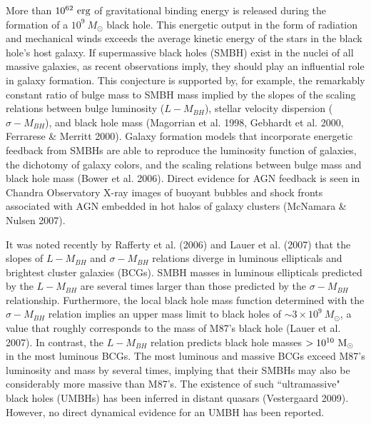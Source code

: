 \documentclass[12pt]{article}
\begin{document}
%
%
\def\gae{\mathrel{\hbox{\rlap{\hbox{\lower2pt\hbox{$\sim$}}}\hbox{\raise2pt\hbox
{$>$}}}}}

\justification          %

More than $10^{62}~\rm erg$ of gravitational binding energy is released during the formation of a $10^9~M_\odot$ black hole.  This energetic output in the form of radiation and mechanical winds exceeds the average kinetic energy of the stars in
the black hole's  host galaxy.  If supermassive black holes (SMBH) exist in the nuclei of all massive galaxies, as recent observations imply, they should play an influential role in galaxy formation.  This conjecture is supported by, for example,  the remarkably constant ratio of bulge mass to SMBH mass implied by the slopes of the  scaling relations between bulge luminosity ($L-M_{BH}$), stellar velocity dispersion ($\sigma - M_{BH}$), and black hole mass (Magorrian et al. 1998, Gebhardt et al. 2000, Ferrarese \& Merritt 2000).   Galaxy formation models that incorporate energetic feedback  from SMBHs 
are able to reproduce the luminosity function of galaxies,  the dichotomy of galaxy colors,  and
the scaling relations between bulge mass and black hole mass (Bower et al. 2006).  Direct evidence for AGN feedback is seen in Chandra Observatory X-ray images of buoyant bubbles and shock fronts associated with AGN embedded in hot halos of galaxy clusters (McNamara \& Nulsen 2007). 


It was noted recently by Rafferty et al. (2006) and Lauer et al. (2007) that the slopes of  $L-M_{BH}$ and  $\sigma - M_{BH}$ relations diverge in luminous ellipticals and brightest cluster galaxies (BCGs).  SMBH masses in luminous ellipticals predicted by the $L- M_{BH}$  are several times larger than those predicted by the $\sigma-M_{BH}$ relationship. Furthermore, the local black hole mass function determined with the $\sigma - M_{BH}$ relation implies an upper mass limit to black holes of $\sim 3\times 10^9~ M_\odot$, a value that roughly corresponds to the mass of M87's black hole (Lauer et al. 2007).
In contrast, the $L-M_{BH}$ relation predicts black hole masses  $> 10^{10}~\rm M_\odot$ in the most luminous BCGs.
The most luminous and massive BCGs exceed M87's luminosity and mass by several 
times, implying that their SMBHs may also be considerably more massive than M87's.    The existence of such ``ultramassive" black holes (UMBHs) has been inferred in distant quasars (Vestergaard 2009).   However,  no direct dynamical evidence for an UMBH has been reported.  
\end{document}
